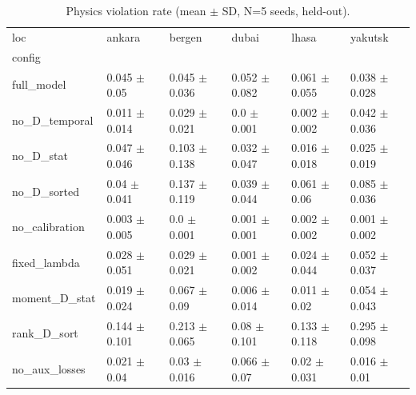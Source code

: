 \begin{table}
\caption{Physics violation rate (mean $\pm$ SD, N=5 seeds, held-out).}
\label{tab:phys_viol_rate_v2}
\begin{tabular}{llllll}
\toprule
loc & ankara & bergen & dubai & lhasa & yakutsk \\
config &  &  &  &  &  \\
\midrule
full\_model & 0.045 $\pm$ 0.05 & 0.045 $\pm$ 0.036 & 0.052 $\pm$ 0.082 & 0.061 $\pm$ 0.055 & 0.038 $\pm$ 0.028 \\
no\_D\_temporal & 0.011 $\pm$ 0.014 & 0.029 $\pm$ 0.021 & 0.0 $\pm$ 0.001 & 0.002 $\pm$ 0.002 & 0.042 $\pm$ 0.036 \\
no\_D\_stat & 0.047 $\pm$ 0.046 & 0.103 $\pm$ 0.138 & 0.032 $\pm$ 0.047 & 0.016 $\pm$ 0.018 & 0.025 $\pm$ 0.019 \\
no\_D\_sorted & 0.04 $\pm$ 0.041 & 0.137 $\pm$ 0.119 & 0.039 $\pm$ 0.044 & 0.061 $\pm$ 0.06 & 0.085 $\pm$ 0.036 \\
no\_calibration & 0.003 $\pm$ 0.005 & 0.0 $\pm$ 0.001 & 0.001 $\pm$ 0.001 & 0.002 $\pm$ 0.002 & 0.001 $\pm$ 0.002 \\
fixed\_lambda & 0.028 $\pm$ 0.051 & 0.029 $\pm$ 0.021 & 0.001 $\pm$ 0.002 & 0.024 $\pm$ 0.044 & 0.052 $\pm$ 0.037 \\
moment\_D\_stat & 0.019 $\pm$ 0.024 & 0.067 $\pm$ 0.09 & 0.006 $\pm$ 0.014 & 0.011 $\pm$ 0.02 & 0.054 $\pm$ 0.043 \\
rank\_D\_sort & 0.144 $\pm$ 0.101 & 0.213 $\pm$ 0.065 & 0.08 $\pm$ 0.101 & 0.133 $\pm$ 0.118 & 0.295 $\pm$ 0.098 \\
no\_aux\_losses & 0.021 $\pm$ 0.04 & 0.03 $\pm$ 0.016 & 0.066 $\pm$ 0.07 & 0.02 $\pm$ 0.031 & 0.016 $\pm$ 0.01 \\
\bottomrule
\end{tabular}
\end{table}


